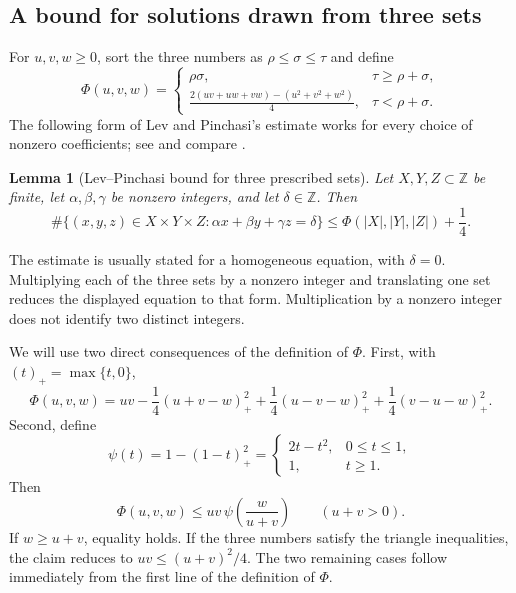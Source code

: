 \documentclass[11pt]{article}
\numberwithin{equation}{section}
\newtheorem{lemma}[lemma]{Lemma}
\theoremstyle{remark}
\newcommand{\Z}{\mathbb Z}
\newcommand{\pos}[1]{(#1)_{+}}
\begin{document}
\subsection{A bound for solutions drawn from three sets}\label{sec:three-set}
For $u,v,w\ge0$, sort the three numbers as $\rho\le\sigma\le\tau$ and
define
\begin{equation}\label{eq:def-Phi}
 \Phi(u,v,w)=
 \begin{cases}
 \rho\sigma,&\tau\ge\rho+\sigma,\\[1mm]
 \displaystyle
 \frac{2(uv+uw+vw)-(u^2+v^2+w^2)}4,&\tau<\rho+\sigma.
 \end{cases}
\end{equation}
The following form of Lev and Pinchasi's estimate works for every choice of
nonzero coefficients; see \cite[Lemma~2]{LevPinchasi} and compare
\cite[Lemma~2.6]{Aaronson}.
\begin{lemma}[Lev--Pinchasi bound for three prescribed sets]
\label{lem:three-set}
Let $X,Y,Z\subset\Z$ be finite, let $\alpha,\beta,\gamma$ be nonzero
integers, and let $\delta\in\Z$.  Then
\begin{equation}\label{eq:three-set}
 \#\{(x,y,z)\in X\times Y\times Z:
 \alpha x+\beta y+\gamma z=\delta\}
 \le \Phi(|X|,|Y|,|Z|)+\frac14.
\end{equation}
\end{lemma}
The estimate is usually stated for a homogeneous equation, with $\delta=0$.
Multiplying each of the three sets by a nonzero integer and translating one
set reduces the displayed equation to that form.  Multiplication by a
nonzero integer does not identify two distinct integers.

We will use two direct consequences of the definition of $\Phi$.  First,
with $(t)_+=\max\{t,0\}$,
\begin{equation}\label{eq:Phi-positive-part}
 \Phi(u,v,w)
 =uv-\frac14\pos{u+v-w}^{2}
  +\frac14\pos{u-v-w}^{2}
  +\frac14\pos{v-u-w}^{2}.
\end{equation}
Second, define
\begin{equation}\label{eq:def-psi}
 \psi(t)=1-\pos{1-t}^{2}
 =\begin{cases}2t-t^2,&0\le t\le1,\\1,&t\ge1.
 \end{cases}
\end{equation}
Then
\begin{equation}\label{eq:Phi-psi}
 \Phi(u,v,w)
 \le uv\,\psi\left(\frac{w}{u+v}\right)
 \qquad (u+v>0).
\end{equation}
If $w\ge u+v$, equality holds.  If the three numbers satisfy the triangle
inequalities, the claim reduces to $uv\le(u+v)^2/4$.  The two remaining
cases follow immediately from the first line of the definition of $\Phi$.
\end{document}
